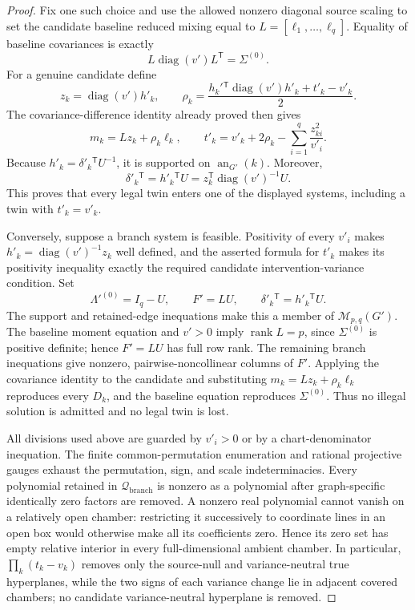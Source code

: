 \documentclass{article}
\begin{document}
\begin{proof}
Fix one such choice and use the allowed nonzero diagonal source scaling to set the candidate baseline reduced mixing equal to \(L=[\ell_1,\ldots,\ell_q]\).  Equality of baseline covariances is exactly
\[
 L\operatorname{diag}(v')L^{\mathsf T}=\Sigma^{(0)}.
\]
For a genuine candidate define
\[
 z_k=\operatorname{diag}(v')h'_k,
 \qquad
 \rho_k=\frac{h_k'{}^{\mathsf T}\operatorname{diag}(v')h'_k+t'_k-v'_k}{2}.
\]
The covariance-difference identity already proved then gives
\[
 m_k=Lz_k+\rho_k\ell_k,
 \qquad
 t'_k=v'_k+2\rho_k-\sum_{i=1}^q\frac{z_{ki}^2}{v'_i}.
\]
Because \(h'_k=\delta'_k{}^{\mathsf T}U^{-1}\), it is supported on \(\operatorname{an}_{G'}(k)\).  Moreover,
\[
 \delta'_k{}^{\mathsf T}=h'_k{}^{\mathsf T}U
 =z_k^{\mathsf T}\operatorname{diag}(v')^{-1}U.
\]
This proves that every legal twin enters one of the displayed systems, including a twin with \(t'_k=v'_k\).

Conversely, suppose a branch system is feasible.  Positivity of every \(v'_i\) makes \(h'_k=\operatorname{diag}(v')^{-1}z_k\) well defined, and the asserted formula for \(t'_k\) makes its positivity inequality exactly the required candidate intervention-variance condition.  Set
\[
 \Lambda'^{(0)}=I_q-U,
 \qquad F'=LU,
 \qquad \delta'_k{}^{\mathsf T}=h'_k{}^{\mathsf T}U.
\]
The support and retained-edge inequations make this a member of \(\mathcal M_{p,q}(G')\).  The baseline moment equation and \(v'>0\) imply \(\operatorname{rank}L=p\), since \(\Sigma^{(0)}\) is positive definite; hence \(F'=LU\) has full row rank.  The remaining branch inequations give nonzero, pairwise-noncollinear columns of \(F'\).  Applying the covariance identity to the candidate and substituting \(m_k=Lz_k+\rho_k\ell_k\) reproduces every \(D_k\), and the baseline equation reproduces \(\Sigma^{(0)}\).  Thus no illegal solution is admitted and no legal twin is lost.

All divisions used above are guarded by \(v'_i>0\) or by a chart-denominator inequation.  The finite common-permutation enumeration and rational projective gauges exhaust the permutation, sign, and scale indeterminacies.  Every polynomial retained in \(\mathcal Q_{\mathrm{branch}}\) is nonzero as a polynomial after graph-specific identically zero factors are removed.  A nonzero real polynomial cannot vanish on a relatively open chamber: restricting it successively to coordinate lines in an open box would otherwise make all its coefficients zero.  Hence its zero set has empty relative interior in every full-dimensional ambient chamber.  In particular, \(\prod_k(t_k-v_k)\) removes only the source-null and variance-neutral true hyperplanes, while the two signs of each variance change lie in adjacent covered chambers; no candidate variance-neutral hyperplane is removed.
\end{proof}
\end{document}
